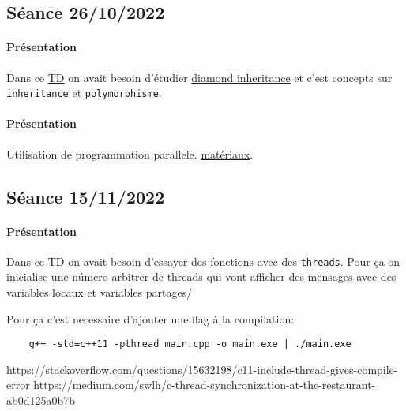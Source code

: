 \documentclass{article}
\begin{document}
\newpage\subsection{Séance 26/10/2022}
\paragraph{Présentation}Dans ce \href{https://perso.ensta-paris.fr/~bmonsuez/Cours/doku.php?id=in204:seances:seance8}{TD} on avait besoin d'étudier \href{https://stackoverflow.com/questions/2659116/how-does-virtual-inheritance-solve-the-diamond-multiple-inheritance-ambiguit}{diamond inheritance} et c'est concepts sur \texttt{inheritance} et \texttt{polymorphisme}.
\begin{scriptsize}\mycode
    
\end{scriptsize}
\paragraph{Présentation}Utilisation de programmation parallele. \href{https://github.com/JBL-Repo/IN204/blob/main/cours_recap.pdf}{matériaux}.
\begin{scriptsize}\mycode
    
\end{scriptsize}

\newpage\subsection{Séance 15/11/2022}
\paragraph{Présentation}Dans ce TD on avait besoin d'essayer des fonctions avec des \texttt{threads}. Pour ça on inicialise une número arbitrer de threads qui vont afficher des mensages avec des variables locaux et variables partages/
\begin{scriptsize}\mycode
    
\end{scriptsize}
Pour ça c'est necessaire d'ajouter une flag à la compilation:
\begin{scriptsize}
    \mycode
    \begin{lstlisting}
    g++ -std=c++11 -pthread main.cpp -o main.exe | ./main.exe
    \end{lstlisting}
\end{scriptsize}
https://stackoverflow.com/questions/15632198/c11-include-thread-gives-compile-error
https://medium.com/swlh/c-thread-synchronization-at-the-restaurant-ab0d125a0b7b
\end{document}
